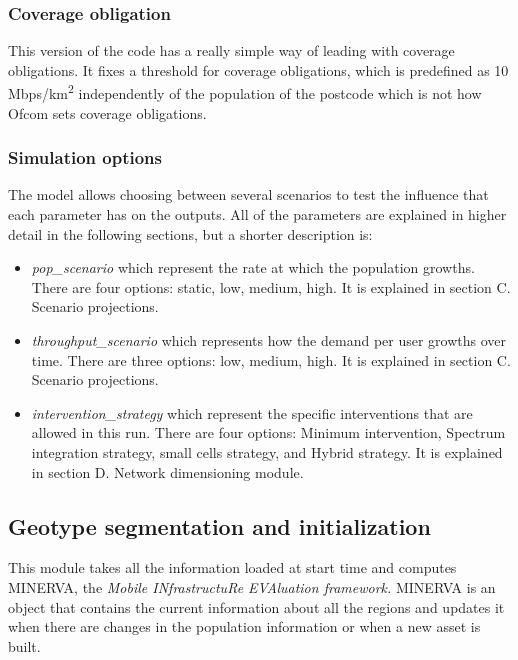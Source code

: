 \subsubsection*{Coverage obligation}
This version of the code has a really simple way of leading with coverage obligations. It fixes a threshold for coverage obligations, which is predefined as 10 Mbps/km\textsuperscript{2} independently of the population of the postcode which is not how Ofcom sets coverage obligations.\par


\subsubsection*{Simulation options}
The model allows choosing between several scenarios to test the influence that each parameter has on the outputs. All of the parameters are explained in higher detail in the following sections, but a shorter description is:\par

\begin{itemize}
	\item \textit{pop\_scenario} which represent the rate at which the population growths. There are four options: static, low, medium, high. It is explained in section C. Scenario projections.\par

	\item \textit{throughput\_scenario} which represents how the demand per user growths over time. There are three options: low, medium, high. It is explained in section C. Scenario projections.\par

	\item \textit{intervention\_strategy }which represent the specific interventions that are allowed in this run. There are four options: Minimum intervention, Spectrum integration strategy, small cells strategy, and Hybrid strategy. It is explained in section D. Network dimensioning module.\par
\end{itemize}

\subsection{Geotype segmentation and initialization}
This module takes all the information loaded at start time and computes MINERVA, the \textit{\guillemotleft Mobile INfrastructuRe EVAluation framework\guillemotright . }MINERVA is an object that contains the current information about all the regions and updates it when there are changes in the population information or when a new asset is built. \par

